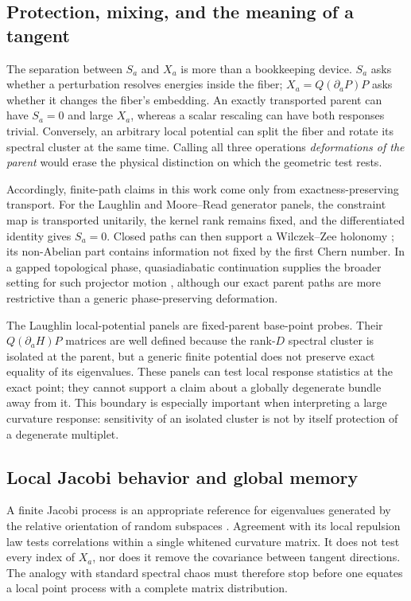 \subsection{Protection, mixing, and the meaning of a tangent}

The separation between $S_a$ and $X_a$ is more than a bookkeeping device.
$S_a$ asks whether a perturbation resolves energies inside the fiber;
$X_a=Q(\partial_aP)P$ asks whether it changes the fiber's embedding.  An
exactly transported parent can have $S_a=0$ and large $X_a$, whereas a scalar
rescaling can have both responses trivial.  Conversely, an arbitrary local
potential can split the fiber and rotate its spectral cluster at the same
time.  Calling all three operations \emph{deformations of the parent} would
erase the physical distinction on which the geometric test rests.

Accordingly, finite-path claims in this work come only from
exactness-preserving transport.  For the Laughlin and Moore--Read generator
panels, the constraint map is transported unitarily, the kernel rank remains
fixed, and the differentiated identity gives $S_a=0$.  Closed paths can then
support a Wilczek--Zee holonomy \cite{wilczekzee1984}; its non-Abelian part
contains information not fixed by the first Chern number.  In a gapped
topological phase, quasiadiabatic continuation supplies the broader setting
for such projector motion \cite{hastingswen2005}, although our exact parent
paths are more restrictive than a generic phase-preserving deformation.

The Laughlin local-potential panels are fixed-parent base-point probes.
Their $Q(\partial_aH)P$ matrices are well defined because the rank-$D$
spectral cluster is isolated at the parent, but a generic finite potential
does not preserve exact equality of its eigenvalues.  These panels can test
local response statistics at the exact point; they cannot support a claim
about a globally degenerate bundle away from it.  This boundary is especially
important when interpreting a large curvature response: sensitivity of an
isolated cluster is not by itself protection of a degenerate multiplet.

\subsection{Local Jacobi behavior and global memory}

A finite Jacobi process is an appropriate reference for eigenvalues generated
by the relative orientation of random subspaces \cite{collins2005}.  Agreement
with its local repulsion law tests correlations within a single whitened
curvature matrix.  It does not test every index of $X_a$, nor does it remove
the covariance between tangent directions.  The analogy with standard
spectral chaos must therefore stop before one equates a local point process
with a complete matrix distribution.

